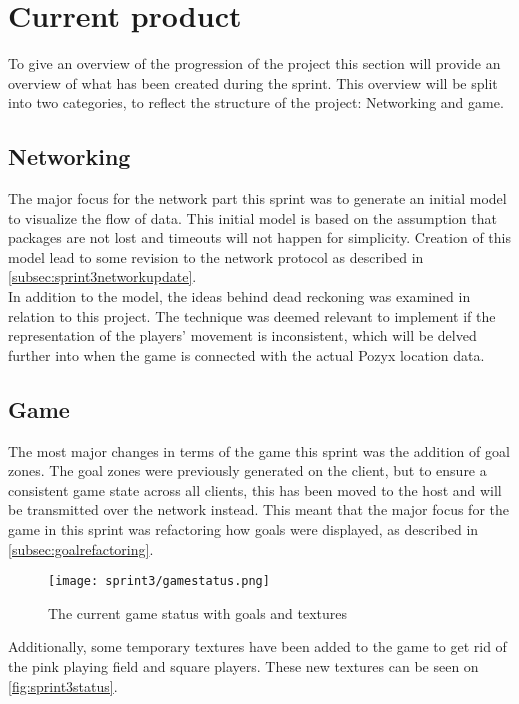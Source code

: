 \section{Current product}
To give an overview of the progression of the project this section will provide an overview of what has been created during the sprint.
This overview will be split into two categories, to reflect the structure of the project: Networking and game.

\subsection{Networking}
The major focus for the network part this sprint was to generate an initial \uppaal model to visualize the flow of data.
This initial model is based on the assumption that packages are not lost and timeouts will not happen for simplicity.
Creation of this model lead to some revision to the network protocol as described in \autoref{subsec:sprint3networkupdate}.\\
In addition to the \uppaal model, the ideas behind dead reckoning was examined in relation to this project.
The technique was deemed relevant to implement if the representation of the players' movement is inconsistent, which will be delved further into when the game is connected with the actual Pozyx location data.

\subsection{Game}
The most major changes in terms of the game this sprint was the addition of goal zones.
The goal zones were previously generated on the client, but to ensure a consistent game state across all clients, this has been moved to the host and will be transmitted over the network instead.
This meant that the major focus for the game in this sprint was refactoring how goals were displayed, as described in \ref{subsec:goalrefactoring}.

\begin{figure}[H]
	\centering
	\texttt{[image: sprint3/gamestatus.png]}
	\caption{The current game status with goals and textures}
	\label{fig:sprint3status}
\end{figure}
\noindent
Additionally, some temporary textures have been added to the game to get rid of the pink playing field and square players.
These new textures can be seen on \autoref{fig:sprint3status}.
